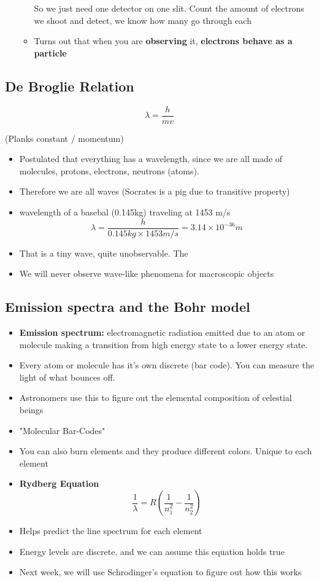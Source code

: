 \documentclass{article}
\begin{document}
\begin{itemize}
\begin{itemize}
        So we just need one detector on one slit. Count the amount of electrons we shoot and detect, we know
        how many go through each
      \item Turns out that when you are \textbf{observing} it, \textbf{electrons behave as a particle}
    \end{itemize}
\end{itemize}

\subsection{De Broglie Relation}
$$ \lambda{} = \frac{h}{mv} $$

(Planks constant  / momentum)

\begin{itemize}
  \item Postulated that everything has a wavelength, since we are all made of molecules, protons, electrons, neutrons (atoms).
  \item Therefore we are all waves (Socrates is a pig due to transitive property)
  \item  wavelength of a basebal (0.145kg) traveling at 1453 m/s
    $$ \lambda = \frac{h}{0.145kg \times 1453 m/s} = 3.14 \times 10^{-36}m$$
  \item That is a tiny wave, quite unobservable. The
  \item We will never observe wave-like phenomena for macroscopic objects
\end{itemize}

\subsection{Emission spectra and the Bohr model}
\begin{itemize}
  \item \textbf{Emission spectrum:} electromagnetic radiation emitted due to an atom or molecule
    making a transition from high energy state to a lower energy state.
  \item Every atom or molecule has it's own discrete (bar code). You can measure the light of what bounces off.
  \item Astronomers use this to figure out the elemental composition of celestial beings
  \item "Molecular Bar-Codes"
  \item You can also burn elements and they produce different colors. Unique to each element
  \item \textbf{Rydberg Equation}
    $$ \frac{1}{\lambda} = R (\frac{1}{n^2_1} - \frac{1}{n^2_2} ) $$
  \item Helps predict the line spectrum for each element
  \item Energy levels are discrete, and we can assume this equation holds true
  \item Next week, we will use Schrodinger's equation to figure out how this works
\end{itemize}
\end{document}
